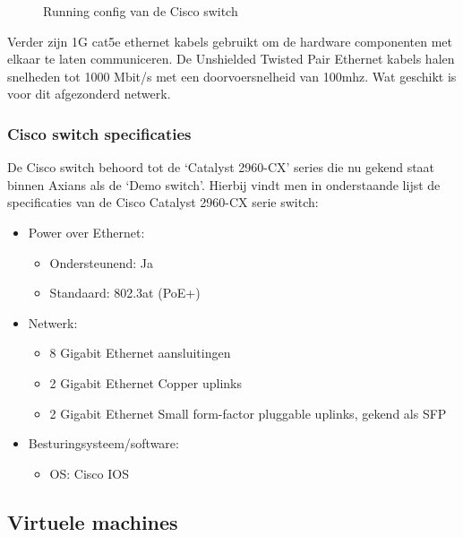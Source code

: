 \begin{figure}[H]
	\centering
	\qquad
	\qquad
	\caption{Running config van de Cisco switch}%
	\label{fig:RunningConfig}%
\end{figure}
Verder zijn 1G cat5e ethernet kabels gebruikt om de hardware componenten met elkaar te laten communiceren. De Unshielded Twisted Pair Ethernet kabels halen snelheden tot 1000 Mbit/s met een doorvoersnelheid van 100mhz. Wat geschikt is voor dit afgezonderd netwerk.

\subsubsection{Cisco switch specificaties}
De Cisco switch behoord tot de ‘Catalyst 2960-CX’ series die nu gekend staat binnen Axians als de ‘Demo switch’. Hierbij vindt men in onderstaande lijst de specificaties van de Cisco Catalyst 2960-CX serie switch:

\begin{itemize}
	\item Power over Ethernet:
	\begin{itemize}
		\item Ondersteunend: Ja
		\item Standaard: 802.3at (PoE+)
	\end{itemize}
	\item Netwerk:
	\begin{itemize}
		\item 8 Gigabit Ethernet aansluitingen
		\item 2 Gigabit Ethernet Copper uplinks
		\item 2 Gigabit Ethernet Small form-factor pluggable uplinks, gekend als SFP
	\end{itemize}
	\item Besturingsysteem/software:
	\begin{itemize}
		\item OS: Cisco IOS
    \end{itemize}
\end{itemize}


\subsection{Virtuele machines}
